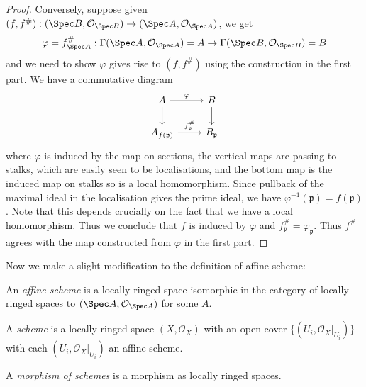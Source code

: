 \documentclass[a4paper]{article}
\newcommand{\sh}[1]{\mathcal{#1}} %
\begin{document}
\begin{proof}
  Conversely, suppose given \((f, f^\#): (\Spec B, \sh O_{\Spec B}) \to (\Spec A, \sh O_{\Spec A})\), we get
  \[
    \varphi = f_{\Spec A}^\#: \Gamma(\Spec A, \sh O_{\Spec A}) = A \to \Gamma(\Spec B, \sh O_{\Spec B}) = B
  \]
  and we need to show \(\varphi\) gives rise to \((f, f^\#)\) using the construction in the first part. We have a commutative diagram
  \[
    \begin{tikzcd}
      A \ar[r, "\varphi"] \ar[d] & B \ar[d] \\
      A_{f(\mathfrak p)} \ar[r, "f_{\mathfrak p}^\#"] & B_{\mathfrak p}
    \end{tikzcd}
  \]
  where \(\varphi\) is induced by the map on sections, the vertical maps are passing to stalks, which are easily seen to be localisations, and the bottom map is the induced map on stalks so is a local homomorphism. Since pullback of the maximal ideal in the localisation gives the prime ideal, we have \(\varphi^{-1}(\mathfrak p) = f(\mathfrak p)\). Note that this depends crucially on the fact that we have a local homomorphism. Thus we conclude that \(f\) is induced by \(\varphi\) and \(f_{\mathfrak p}^\# = \varphi_{\mathfrak p}\). Thus \(f^\#\) agrees with the map constructed from \(\varphi\) in the first part.
\end{proof}

Now we make a slight modification to the definition of affine scheme:
\begin{definition}
  An \emph{affine scheme} is a locally ringed space isomorphic in the category of locally ringed spaces to \((\Spec A, \sh O_{\Spec A})\) for some \(A\).
\end{definition}

\begin{definition}[scheme]
  A \emph{scheme} is a locally ringed space \((X, \sh O_X)\) with an open cover \(\{(U_i, \sh O_X|_{U_i})\}\) with each \((U_i, \sh O_X|_{U_i})\) an affine scheme.

  A \emph{morphism of schemes} is a morphism as locally ringed spaces.
\end{definition}
\end{document}
